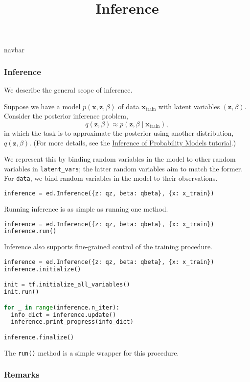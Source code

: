 \title{Inference}

{{navbar}}

\subsubsection{Inference}

We describe the general scope of inference.

Suppose we have a model $p(\mathbf{x}, \mathbf{z}, \beta)$ of data $\mathbf{x}_{\text{train}}$ with latent variables $(\mathbf{z}, \beta)$.
Consider the posterior inference problem,
\begin{equation*}
q(\mathbf{z}, \beta)\approx p(\mathbf{z}, \beta\mid \mathbf{x}_{\text{train}}),
\end{equation*}
in which the task is to approximate the posterior using another
distribution, $q(\mathbf{z},\beta)$. (For more details, see the
\href{/tutorials/inference} {Inference of Probability Models
tutorial}.)

We represent this by binding random variables in the model to other
random variables in \texttt{latent_vars}; the latter random variables
aim to match the former. For \texttt{data}, we bind random variables
in the model to their observations.

\begin{lstlisting}[language=Python]
inference = ed.Inference({z: qz, beta: qbeta}, {x: x_train})
\end{lstlisting}

Running inference is as simple as running one method.
\begin{lstlisting}[language=Python]
inference = ed.Inference({z: qz, beta: qbeta}, {x: x_train})
inference.run()
\end{lstlisting}
%
Inference also supports fine-grained control of the training procedure.
%
\begin{lstlisting}[language=Python]
inference = ed.Inference({z: qz, beta: qbeta}, {x: x_train})
inference.initialize()

init = tf.initialize_all_variables()
init.run()

for _ in range(inference.n_iter):
  info_dict = inference.update()
  inference.print_progress(info_dict)

inference.finalize()
\end{lstlisting}
The \texttt{run()} method is a simple wrapper for this procedure.

\subsubsection{Remarks}


